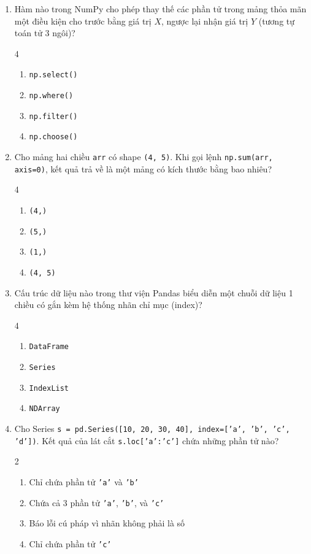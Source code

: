\documentclass[11pt,a4paper]{article}
\begin{document}
\begin{enumerate}[leftmargin=*,itemsep=2.5pt,resume]
\item Hàm nào trong NumPy cho phép thay thế các phần tử trong mảng thỏa mãn một điều kiện cho trước bằng giá trị $X$, ngược lại nhận giá trị $Y$ (tương tự toán tử 3 ngôi)?
\begin{multicols}{4}
\begin{enumerate}[label=\Alph*.]
  \item \texttt{np.select()}
  \item \texttt{np.where()}
  \item \texttt{np.filter()}
  \item \texttt{np.choose()}
\end{enumerate}
\end{multicols}

\item Cho mảng hai chiều \texttt{arr} có shape \texttt{(4, 5)}. Khi gọi lệnh \texttt{np.sum(arr, axis=0)}, kết quả trả về là một mảng có kích thước bằng bao nhiêu?
\begin{multicols}{4}
\begin{enumerate}[label=\Alph*.]
  \item \texttt{(4,)}
  \item \texttt{(5,)}
  \item \texttt{(1,)}
  \item \texttt{(4, 5)}
\end{enumerate}
\end{multicols}

\item Cấu trúc dữ liệu nào trong thư viện Pandas biểu diễn một chuỗi dữ liệu 1 chiều có gắn kèm hệ thống nhãn chỉ mục (index)?
\begin{multicols}{4}
\begin{enumerate}[label=\Alph*.]
  \item \texttt{DataFrame}
  \item \texttt{Series}
  \item \texttt{IndexList}
  \item \texttt{NDArray}
\end{enumerate}
\end{multicols}

\item Cho Series \texttt{s = pd.Series([10, 20, 30, 40], index=['a', 'b', 'c', 'd'])}. Kết quả của lát cắt \texttt{s.loc['a':'c']} chứa những phần tử nào?
\begin{multicols}{2}
\begin{enumerate}[label=\Alph*.]
  \item Chỉ chứa phần tử \texttt{'a'} và \texttt{'b'}
  \item Chứa cả 3 phần tử \texttt{'a'}, \texttt{'b'}, và \texttt{'c'}
  \item Báo lỗi cú pháp vì nhãn không phải là số
  \item Chỉ chứa phần tử \texttt{'c'}
\end{enumerate}
\end{multicols}


\end{enumerate}
\end{document}
